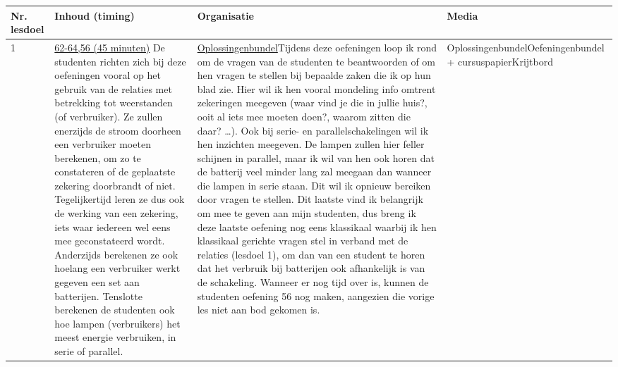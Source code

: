 \begin{landscape}
	
	\begin{tabularx}{1.56\textwidth}{|p{1.5cm}|p{6cm}|X|p{4cm}|}
		\hline
		\textbf{Nr. lesdoel } & \textbf{Inhoud (timing)}  & \textbf{Organisatie } & \textbf{Media } \\ \hline
		1\newline 3\newline 6\newline 7\newline 8\newline &\underline{62-64,56 (45 minuten)}\newline
		De studenten richten zich bij deze oefeningen vooral op het gebruik van de relaties met betrekking tot weerstanden (of verbruiker). Ze zullen enerzijds de stroom doorheen een verbruiker moeten berekenen, om zo te constateren of de geplaatste zekering doorbrandt of niet. Tegelijkertijd leren ze dus ook de werking van een zekering, iets waar iedereen wel eens mee geconstateerd wordt. Anderzijds berekenen ze ook hoelang een verbruiker werkt gegeven een set aan batterijen. Tenslotte berekenen de studenten ook hoe lampen (verbruikers) het meest energie verbruiken, in serie of parallel.  
		& \underline{Oplossingenbundel}\newline Tijdens deze oefeningen loop ik rond om de vragen van de studenten te beantwoorden of om hen vragen te stellen bij bepaalde zaken die ik op hun blad zie. Hier wil ik hen vooral mondeling info omtrent zekeringen meegeven (waar vind je die in jullie huis?, ooit al iets mee moeten doen?, waarom zitten die daar? \ldots). Ook bij serie- en parallelschakelingen wil ik hen inzichten meegeven. De lampen zullen hier feller schijnen in parallel, maar ik wil van hen ook horen dat de batterij veel minder lang zal meegaan dan wanneer die lampen in serie staan. Dit wil ik opnieuw bereiken door vragen te stellen. Dit laatste vind ik belangrijk om mee te geven aan mijn studenten, dus breng ik deze laatste oefening nog eens klassikaal waarbij ik hen klassikaal gerichte vragen stel in verband met de relaties (lesdoel 1), om dan van een student te horen dat het verbruik bij batterijen ook afhankelijk is van de schakeling. Wanneer er nog tijd over is, kunnen de studenten oefening 56 nog maken, aangezien die vorige les niet aan bod gekomen is.
		& Oplossingenbundel\newline Oefeningenbundel + cursuspapier\newline Krijtbord
		\\ \hline
	\end{tabularx}
	

\end{landscape}
